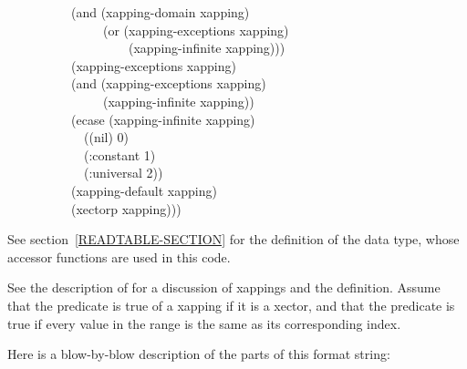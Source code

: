 \begin{table}[t]
\begin{lisp}
~~~~~~~~~~(and (xapping-domain xapping) \\
~~~~~~~~~~~~~~~(or (xapping-exceptions xapping) \\
~~~~~~~~~~~~~~~~~~~(xapping-infinite xapping))) \\
~~~~~~~~~~(xapping-exceptions xapping) \\
~~~~~~~~~~(and (xapping-exceptions xapping) \\
~~~~~~~~~~~~~~~(xapping-infinite xapping)) \\
~~~~~~~~~~(ecase (xapping-infinite xapping) \\
~~~~~~~~~~~~((nil) 0) \\
~~~~~~~~~~~~(:constant 1) \\
~~~~~~~~~~~~(:universal 2)) \\
~~~~~~~~~~(xapping-default xapping) \\
~~~~~~~~~~(xectorp xapping)))
\end{lisp}
\endgroup
See section~\ref{READTABLE-SECTION} for the  definition of the  data
type, whose accessor functions are used in this code.
\end{table}

\begin{new}
See the description of  for a discussion of xappings
and the  definition.  Assume that the predicate 
is true of a xapping if it is a xector, and that the predicate 
is true if every value in the range is the same as its corresponding index.

Here is a blow-by-blow description of the parts of this format string:
\end{new}

